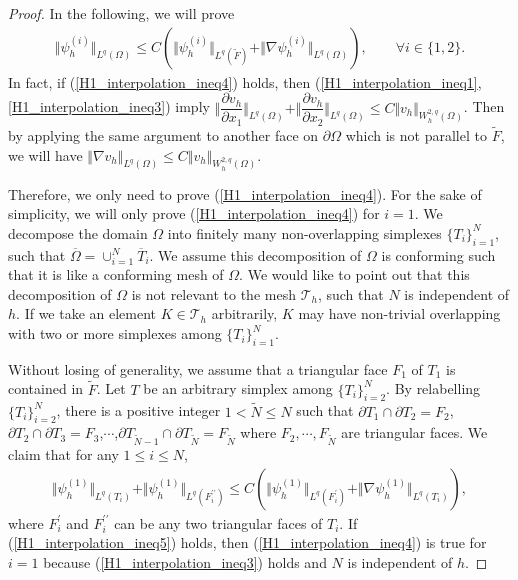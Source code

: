 \documentclass[12pt]{amsart}
\theoremstyle{definition}
\theoremstyle{remark}
\begin{document}
\begin{proof}
In the following, we will prove
\begin{align}
\label{H1_interpolation_ineq4}
\Vert \psi_{h}^{(i)} \Vert_{L^{q}(\Omega)} \leq C \left( \Vert \psi_{h}^{(i)} \Vert_{L^{q}(\tilde{F})} 
+ \Vert \nabla \psi_{h}^{(i)} \Vert_{L^{q}(\Omega)} \right), \qquad \forall i\in \{1,2\}.
\end{align}
In fact, if (\ref{H1_interpolation_ineq4}) holds, then (\ref{H1_interpolation_ineq1},\ref{H1_interpolation_ineq3}) imply 
$\Vert \dfrac{\partial v_{h}}{\partial x_{1}} \Vert_{L^{q}(\Omega)} 
+ \Vert \dfrac{\partial v_{h}}{\partial x_{2}} \Vert_{L^{q}(\Omega)} 
\leq C \Vert v_{h}\Vert_{W_{h}^{2,q}(\Omega)}$.
Then by applying the same argument to another face on $\partial\Omega$ which is not parallel to $\tilde{F}$, we will have 
$\Vert \nabla v_{h} \Vert_{L^{q}(\Omega)} \leq C \Vert v_{h}\Vert_{W_{h}^{2,q}(\Omega)}$.

Therefore, we only need to prove (\ref{H1_interpolation_ineq4}). For the sake of simplicity, we will only prove 
(\ref{H1_interpolation_ineq4}) for $i=1$. We decompose the domain $\Omega$ into finitely many non-overlapping simplexes 
$\{ T_{i} \}_{i=1}^{N}$, such that $\overline{\Omega} = \cup_{i=1}^{N} \overline{T}_{i}$. We assume this decomposition 
of $\Omega$ is conforming such that it is like a conforming mesh of $\Omega$.
We would like to point out that this decomposition of $\Omega$ is not relevant to the mesh $\mathcal{T}_{h}$, such that 
$N$ is independent of $h$. If we take an element $K\in\mathcal{T}_{h}$ arbitrarily, $K$ may have non-trivial overlapping 
with two or more simplexes among $\{ T_{i} \}_{i=1}^{N}$.

Without losing of generality, we assume that a triangular face $F_{1}$ of $T_{1}$ is contained in $\tilde{F}$.
Let $T$ be an arbitrary simplex among $\{ T_{i} \}_{i=2}^{N}$. By relabelling $\{ T_{i} \}_{i=2}^{N}$, there is a 
positive integer $1< \tilde{N} \leq N$ such that $\partial T_{1} \cap \partial T_{2} = F_{2}$, 
$\partial T_{2} \cap \partial T_{3} = F_{3}$,$\cdots$,$\partial T_{\tilde{N}-1}\cap \partial T_{\tilde{N}} = F_{\tilde{N}}$ 
where $F_{2},\cdots,F_{\tilde{N}}$ are triangular faces.
We claim that for any $1\leq i \leq N$,
\begin{align}
\label{H1_interpolation_ineq5} 
\Vert \psi_{h}^{(1)} \Vert_{L^{q}(T_{i})} + \Vert \psi_{h}^{(1)} \Vert_{L^{q}(F_{i}^{\prime\prime})} 
\leq C \left( \Vert \psi_{h}^{(1)} \Vert_{L^{q}(F_{i}^{\prime})} 
+ \Vert \nabla \psi_{h}^{(1)} \Vert_{L^{q}(T_{i})} \right),
\end{align}
where $F_{i}^{\prime}$ and $F_{i}^{\prime\prime}$ can be any two triangular faces of $T_{i}$. 
If (\ref{H1_interpolation_ineq5}) holds, then (\ref{H1_interpolation_ineq4}) is true for $i=1$ 
because (\ref{H1_interpolation_ineq3}) holds and $N$ is independent of $h$.


\end{proof}
\end{document}
